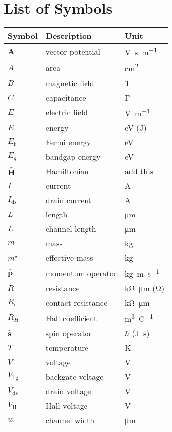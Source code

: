 \chapter*{List of Symbols}
\begin{longtable}[l]{p{125pt} p{150pt} p{150pt}} 
\toprule
	\textbf{Symbol}	& \textbf{Description} & \textbf{Unit} \\ 
\midrule
	$\mathbf{A}$ & vector potential & \si{\volt\second\per\metre}\\
	$A$ & area & \si{\cm\squared}\\
	$B$ & magnetic field & \si{\tesla}\\
	$C$ & capacitance & \si{\farad}\\
	$E$ & electric field & \si{\volt\per\metre}\\
	$E$ & energy & \si{\electronvolt} (\si{\joule})\\
	$E_\mathrm{F}$  & Fermi energy & \si{\electronvolt}\\
	$E_g$ & bandgap energy & \si{\electronvolt}\\
	$\hat{\mathbf{H}}$ & Hamiltonian & add this\\
	$I$ & current & \si{\ampere}\\
	$I_\mathrm{ds}$ & drain current & \si{\ampere}\\
	$L$ & length & \si{\micro\metre}\\
	$L$ & channel length & \si{\micro\metre}\\
	$m$ & mass & \si{\kg}\\
	$m^\star$ & effective mass & \si{\kg}\\
	$\hat{\mathbf{p}}$ & momentum operator & \si{\kg\metre\per\second}\\
	$R$ & resistance & \si{\kilo\ohm\micro\metre} (\si{\ohm})\\
	$R_c$ & contact resistance & \si{\kilo\ohm\micro\metre}\\
	$R_H$ & Hall coefficient & \si{\metre\cubed\per\coulomb}\\
	$\hat{\mathbf{s}}$ & spin operator & $\hbar$ (\si{\joule\second})\\
	$T$ & temperature & \si{\kelvin}\\
	$V$ & voltage & \si{\volt}\\
	$V_\mathrm{bg}$ & backgate voltage & \si{\volt}\\
	$V_\mathrm{ds}$ & drain voltage & \si{\volt}\\
	$V_\mathrm{H}$ & Hall voltage & \si{\volt}\\
	$w$ & channel width & \si{\micro\metre}\\


\end{longtable}

